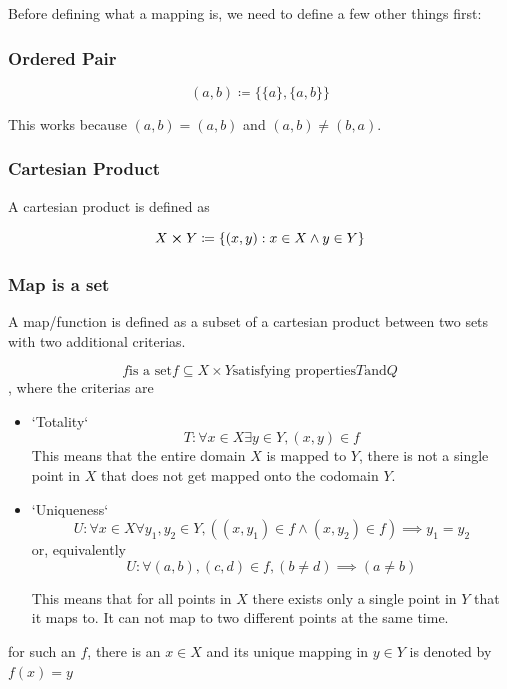 \documentclass[11pt,a4paper]{article}
\begin{document}
Before defining what a mapping is, we need to define a few other things first:

\subsubsection{Ordered Pair}

\begin{equation}
  (a, b) \coloneqq \{\{a\}, \{a, b\}\}
\end{equation}

This works because $(a, b) = (a, b)$ and $(a, b) \not = (b, a)$.

\subsubsection{Cartesian Product}

A cartesian product is defined as

\begin{equation}
  X \cross Y \coloneq \{ (x,y): x \in X \land y \in Y \}
\end{equation}

\subsubsection{Map is a set}

A map/function is defined as a subset of a cartesian product between two
sets with two additional criterias.

\begin{equation}
  f \text{is a set} f \subseteq X \times Y \text{satisfying properties} T \text{and} Q
\end{equation},
where the criterias are
\begin{itemize}
  \item `Totality`
        \begin{equation}
          T: \forall x \in X \exists y \in Y, (x, y) \in f
        \end{equation}
        This means that the entire domain $X$ is mapped to $Y$, there is not a single point
        in $X$ that does not get mapped onto the codomain $Y$.
  \item `Uniqueness`
        \begin{equation}
          U: \forall x \in X \forall y_1, y_2 \in Y, ((x, y_1) \in f \land (x, y_2) \in f) \implies y_1 = y_2
        \end{equation}
        or, equivalently
        \begin{equation}
          U: \forall (a,b), (c,d) \in f, (b \not = d) \implies (a \not = b)
        \end{equation}

        This means that for all points in $X$ there exists only a single point in $Y$ that
        it maps to. It can not map to two different points at the same time.
\end{itemize}
for such an $f$, there is an $x \in X$ and its unique mapping in $y \in Y$ is denoted by $f(x) = y$
\end{document}
